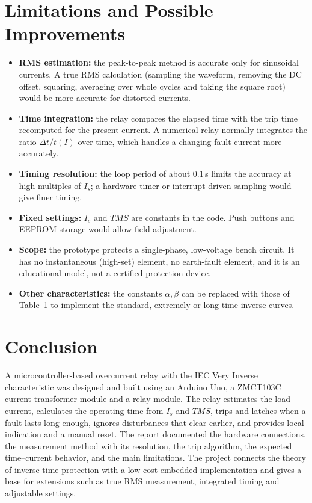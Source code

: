 \documentclass[12pt, a4paper]{article}
\begin{document}
\section{Limitations and Possible Improvements}
\label{sec:limits}
\begin{itemize}
  \item \textbf{RMS estimation:} the peak-to-peak method is accurate only for sinusoidal currents. A true RMS calculation (sampling the waveform, removing the DC offset, squaring, averaging over whole cycles and taking the square root) would be more accurate for distorted currents.
  \item \textbf{Time integration:} the relay compares the elapsed time with the trip time recomputed for the present current. A numerical relay normally integrates the ratio $\Delta t / t(I)$ over time, which handles a changing fault current more accurately.
  \item \textbf{Timing resolution:} the loop period of about 0.1\,s limits the accuracy at high multiples of $I_s$; a hardware timer or interrupt-driven sampling would give finer timing.
  \item \textbf{Fixed settings:} $I_s$ and $TMS$ are constants in the code. Push buttons and EEPROM storage would allow field adjustment.
  \item \textbf{Scope:} the prototype protects a single-phase, low-voltage bench circuit. It has no instantaneous (high-set) element, no earth-fault element, and it is an educational model, not a certified protection device.
  \item \textbf{Other characteristics:} the constants $\alpha,\beta$ can be replaced with those of Table~1 to implement the standard, extremely or long-time inverse curves.
\end{itemize}

\section{Conclusion}
A microcontroller-based overcurrent relay with the IEC Very Inverse characteristic was designed and built using an Arduino Uno, a ZMCT103C current transformer module and a relay module. The relay estimates the load current, calculates the operating time from $I_s$ and $TMS$, trips and latches when a fault lasts long enough, ignores disturbances that clear earlier, and provides local indication and a manual reset. The report documented the hardware connections, the measurement method with its resolution, the trip algorithm, the expected time--current behavior, and the main limitations. The project connects the theory of inverse-time protection with a low-cost embedded implementation and gives a base for extensions such as true RMS measurement, integrated timing and adjustable settings.
\end{document}
